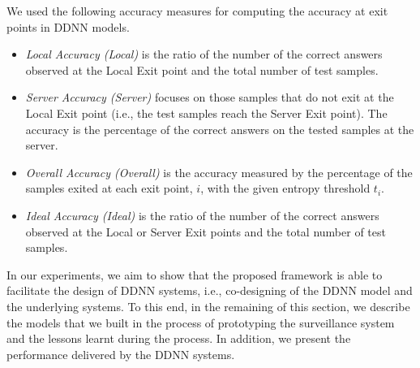 \documentclass[conference]{IEEEtran}
\begin{document}

We used the following accuracy measures for computing the accuracy at exit points in DDNN models.
\begin{itemize}
  \item \emph{Local Accuracy (Local)} is the ratio of the number of the correct answers observed at the Local Exit point and the total number of test samples.
  \item \emph{Server Accuracy (Server) } focuses on those samples that do not exit at the Local Exit point (i.e., the test samples reach the Server Exit point). The accuracy is the percentage of the correct answers on the tested samples at the server.
  \item \emph{Overall Accuracy (Overall)} is the accuracy measured by the percentage of the samples exited at each exit point, $i$, with the given entropy threshold $t_{i}$.
  \item \emph{Ideal Accuracy (Ideal)} is the ratio of the number of the correct answers observed at the Local or  Server Exit points and the total number of test samples.
\end{itemize}


In our experiments, we aim to show that the proposed framework is able to facilitate the design of DDNN systems, i.e., co-designing of the DDNN model and the underlying systems. To this end, in the remaining of this section, we describe the models that we built in the process of prototyping the surveillance system and the lessons learnt during the process. In addition, we present the performance delivered by the DDNN systems. %
\end{document}
